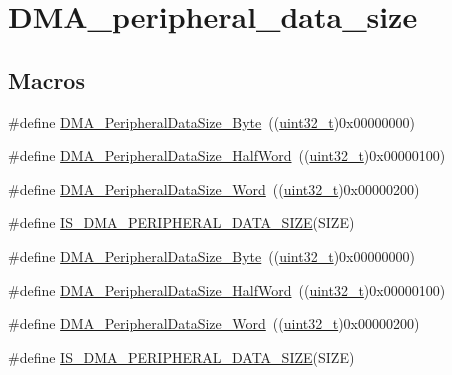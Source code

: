 \hypertarget{group___d_m_a__peripheral__data__size}{}\section{D\+M\+A\+\_\+peripheral\+\_\+data\+\_\+size}
\label{group___d_m_a__peripheral__data__size}
\subsection*{Macros}
\begin{DoxyCompactItemize}
\item 
\#define \hyperlink{group___d_m_a__peripheral__data__size_ga7577035ae4ff413164000227a8cea346}{D\+M\+A\+\_\+\+Peripheral\+Data\+Size\+\_\+\+Byte}~((\hyperlink{_p_e___types_8h_a33594304e786b158f3fb30289278f5af}{uint32\+\_\+t})0x00000000)
\item 
\#define \hyperlink{group___d_m_a__peripheral__data__size_gab1988e5005ee65c261018f62866e4585}{D\+M\+A\+\_\+\+Peripheral\+Data\+Size\+\_\+\+Half\+Word}~((\hyperlink{_p_e___types_8h_a33594304e786b158f3fb30289278f5af}{uint32\+\_\+t})0x00000100)
\item 
\#define \hyperlink{group___d_m_a__peripheral__data__size_ga516ea7a40945d8325fe73e079b245ea1}{D\+M\+A\+\_\+\+Peripheral\+Data\+Size\+\_\+\+Word}~((\hyperlink{_p_e___types_8h_a33594304e786b158f3fb30289278f5af}{uint32\+\_\+t})0x00000200)
\item 
\#define \hyperlink{group___d_m_a__peripheral__data__size_gad7916e0ae55cdf5efdfa68a09a028037}{I\+S\+\_\+\+D\+M\+A\+\_\+\+P\+E\+R\+I\+P\+H\+E\+R\+A\+L\+\_\+\+D\+A\+T\+A\+\_\+\+S\+I\+ZE}(S\+I\+ZE)
\item 
\#define \hyperlink{group___d_m_a__peripheral__data__size_ga7577035ae4ff413164000227a8cea346}{D\+M\+A\+\_\+\+Peripheral\+Data\+Size\+\_\+\+Byte}~((\hyperlink{_p_e___types_8h_a33594304e786b158f3fb30289278f5af}{uint32\+\_\+t})0x00000000)
\item 
\#define \hyperlink{group___d_m_a__peripheral__data__size_gab1988e5005ee65c261018f62866e4585}{D\+M\+A\+\_\+\+Peripheral\+Data\+Size\+\_\+\+Half\+Word}~((\hyperlink{_p_e___types_8h_a33594304e786b158f3fb30289278f5af}{uint32\+\_\+t})0x00000100)
\item 
\#define \hyperlink{group___d_m_a__peripheral__data__size_ga516ea7a40945d8325fe73e079b245ea1}{D\+M\+A\+\_\+\+Peripheral\+Data\+Size\+\_\+\+Word}~((\hyperlink{_p_e___types_8h_a33594304e786b158f3fb30289278f5af}{uint32\+\_\+t})0x00000200)
\item 
\#define \hyperlink{group___d_m_a__peripheral__data__size_gad7916e0ae55cdf5efdfa68a09a028037}{I\+S\+\_\+\+D\+M\+A\+\_\+\+P\+E\+R\+I\+P\+H\+E\+R\+A\+L\+\_\+\+D\+A\+T\+A\+\_\+\+S\+I\+ZE}(S\+I\+ZE)
\end{DoxyCompactItemize}


